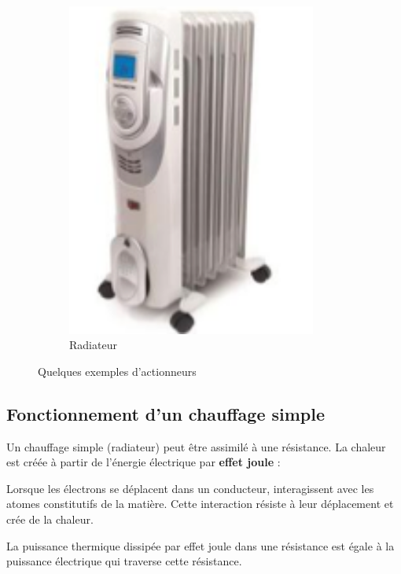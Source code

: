 \documentclass[10pt,fleqn]{article} %
\begin{document}
\begin{figure}[h]
\begin{subfigure}{.24\textwidth}
    \includegraphics[width=0.9\textwidth,height=.1\textheight,keepaspectratio]{images/radiateur}
    \caption{Radiateur}
  \end{subfigure}
  \caption{Quelques exemples d'actionneurs}
  \label{fig:exemples}
\end{figure}

\subsection{Fonctionnement d'un chauffage simple}

Un chauffage simple (radiateur) peut être assimilé à une résistance. La chaleur est créée à partir de l'énergie électrique par \textbf{effet joule} :

Lorsque les électrons se déplacent dans un conducteur, interagissent avec les atomes constitutifs de la matière. Cette interaction résiste à leur déplacement et crée de la chaleur.

\begin{aretenir}
  La puissance thermique dissipée par effet joule dans une résistance est égale à la puissance électrique qui traverse cette résistance.
\end{aretenir}
\end{document}
